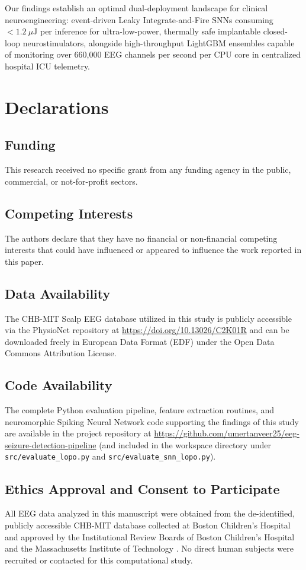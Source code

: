 \documentclass[pdflatex,sn-mathphys-num]{sn-jnl}
\begin{document}
Our findings establish an optimal dual-deployment landscape for clinical neuroengineering: event-driven Leaky Integrate-and-Fire SNNs consuming $< 1.2\ \mu\text{J}$ per inference for ultra-low-power, thermally safe implantable closed-loop neurostimulators, alongside high-throughput LightGBM ensembles capable of monitoring over 660,000 EEG channels per second per CPU core in centralized hospital ICU telemetry.

\section*{Declarations}

\subsection*{Funding}
This research received no specific grant from any funding agency in the public, commercial, or not-for-profit sectors.

\subsection*{Competing Interests}
The authors declare that they have no financial or non-financial competing interests that could have influenced or appeared to influence the work reported in this paper.

\subsection*{Data Availability}
The CHB-MIT Scalp EEG database utilized in this study is publicly accessible via the PhysioNet repository at \url{https://doi.org/10.13026/C2K01R} \cite{guttag2010chb,goldberger2000physiobank,shoeb2009} and can be downloaded freely in European Data Format (EDF) under the Open Data Commons Attribution License.

\subsection*{Code Availability}
The complete Python evaluation pipeline, feature extraction routines, and neuromorphic Spiking Neural Network code supporting the findings of this study are available in the project repository at \url{https://github.com/umertanveer25/eeg-seizure-detection-pipeline} (and included in the workspace directory under \texttt{src/evaluate\_lopo.py} and \texttt{src/evaluate\_snn\_lopo.py}).

\subsection*{Ethics Approval and Consent to Participate}
All EEG data analyzed in this manuscript were obtained from the de-identified, publicly accessible CHB-MIT database collected at Boston Children's Hospital and approved by the Institutional Review Boards of Boston Children's Hospital and the Massachusetts Institute of Technology \cite{guttag2010chb,shoeb2009}. No direct human subjects were recruited or contacted for this computational study.
\end{document}
